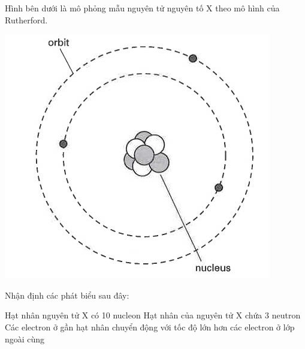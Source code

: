 \begin{ex}
	Hình bên dưới là mô phỏng mẫu nguyên tử nguyên tố X theo mô hình của Rutherford.
	\begin{center}
		\includegraphics[width=0.25\linewidth]{figs/VN12-Y24-PH-SYL-026P-3}
	\end{center}
	Nhận định các phát biểu sau đây:
	
	{Hạt nhân nguyên tử X có 10 nucleon}
	{Hạt nhân của nguyên tử X chứa 3 neutron}
	{\True Các electron ở gần hạt nhân chuyển động với tốc độ lớn hơn các electron ở lớp ngoài cùng}
\end{ex}
